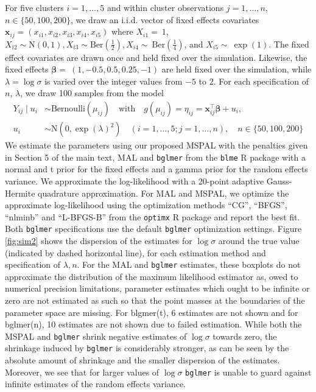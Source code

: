 \documentclass[11pt, a4paper]{article}
\newcommand*{\bb}{\boldsymbol}
\theoremstyle{example} \newtheorem{example}{Example}[section]
\theoremstyle{theorem} \newtheorem{theorem}{Theorem}[section]
\theoremstyle{theorem }\newtheorem{proposition}{Proposition}[section]
\theoremstyle{theorem }\newtheorem{corollary}{Corollary}[section]
\def\\bbeta{\bb{\\bbeta}}
\def\bx{\bb{x}}
\begin{document}
For five clusters $i=1,\ldots,5$ and within cluster observations $j=1,\ldots,n$, $n \in \{50,100,200\}$, we draw an i.i.d. vector of fixed effects covariates $\bx_{ij} = (x_{i1},x_{i2},x_{i3},x_{i4},x_{i5})$ where $X_{i1}=~1$, ${X}_{i2} \sim \text{N}(0,1), {X}_{i3}\sim \textrm{Ber}\left(\frac{1}{2}\right), {X}_{i4}\sim~\textrm{Ber}\left(\frac{1}{4}\right)$, and ${X}_{i5}\sim~\exp(1)$. The fixed effect covariates are drawn once and held fixed over the simulation. Likewise, the fixed effects $\bb \beta  =~(1,-0.5,0.5,0.25,-1)$ are held fixed over the simulation, while $\lambda = \log \sigma$ is varied  over the integer values from $-5$ to $2$. For each specification of $n$, $\lambda$, we draw 100 samples from the model 
\begin{equation}
\begin{aligned}
\label{eq:sim2_model} 
Y_{ij} \mid {u}_i & \sim \text{Bernoulli}(\mu_{ij}) \quad \text{with} \quad
g(\mu_{ij}) = \eta_{ij} = \bx_{ij}^\top \bb \beta + u_i,\\
u_i & \sim \text{N}(0, \exp (\lambda)^2 )  \quad (i = 1, \ldots, 5; j = 1, \ldots, n), \quad n\in \{50,100,200\}
\end{aligned}
\end{equation}
We estimate the parameters using our proposed MSPAL with the penalties given in Section 5 of the main text, MAL and \texttt{bglmer}  from the \texttt{blme} R package \citep{chung+etal:2013} with a normal and t prior for the fixed effects and a gamma prior for the random effects variance. We approximate the log-likelihood with a 20-point adaptive Gauss-Hermite quadrature approximation. For MAL and MSPAL, we optimize the approximate log-likelihood using the optimization methods ``CG'', ``BFGS'', ``nlminb'' and ``L-BFGS-B'' from the \texttt{optimx} R package \citep{nash+varadhan:2011} and report the best fit. Both \texttt{bglmer} specifications use the default \texttt{bglmer} optimization settings. Figure \ref{fig:sim2} shows the dispersion of the estimates for $\log \sigma$ around the true value (indicated by dashed horizontal line), for each estimation method and specification of $\lambda ,n$. For the MAL and \texttt{bglmer} estimates, these boxplots do not approximate the distribution of the maximum likelihood estimator as, owed to numerical precision limitations, parameter estimates which ought to be infinite or zero are not estimated as such so that the point masses at the boundaries of the parameter space are missing. For blgmer(t), 6 estimates are not shown and for bglmer(n), 10 estimates are not shown due to failed estimation. While both the MSPAL and \texttt{bglmer} shrink negative estimates of $\log \sigma$ towards zero, the shrinkage induced by \texttt{bglmer} is considerably stronger, as can be seen by the absolute amount of shrinkage and the smaller dispersion of the estimates. Moreover, we see that for larger values of $\log \sigma$ \texttt{bglmer} is unable to guard against infinite estimates of the random effects variance. 
\end{document}

